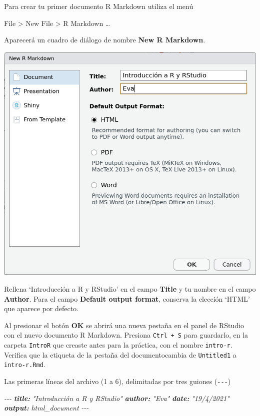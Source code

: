 \documentclass[
  degree=mecinf,
  title=normal,
  toc=normal,
  bib=normal]{mnye}
\newenvironment{Shaded}{\begin{snugshade}}{\end{snugshade}}
\newcommand{\AnnotationTok}[1]{\textcolor[rgb]{0.56,0.35,0.01}{\textbf{\textit{#1}}}}
\newcommand{\CommentTok}[1]{\textcolor[rgb]{0.56,0.35,0.01}{\textit{#1}}}
\begin{document}
Para crear tu primer documento R Markdown utiliza el menú

\begin{menu}
File \textgreater{} New File \textgreater{} R Markdown \ldots{}

\end{menu}

Aparecerá un cuadro de diálogo de nombre \textbf{New R Markdown}.

\begin{center}\includegraphics[width=1\linewidth]{images/new-r-markdown} \end{center}

Rellena `Introducción a R y RStudio' en el campo \textbf{Title} y tu nombre en el campo \textbf{Author}. Para el campo \textbf{Default output format}, conserva la elección `HTML' que aparece por defecto.

Al presionar el botón \textbf{OK} se abrirá una nueva pestaña en el panel de \textsf{RStudio} con el nuevo documento R Markdown. Presiona \texttt{Ctrl\ +\ S} para guardarlo, en la carpeta \texttt{IntroR} que creaste antes para la práctica, con el nombre \texttt{intro-r}. Verifica que la etiqueta de la pestaña del documentocambia de \texttt{Untitled1} a \texttt{intro-r.Rmd}.

Las primeras líneas del archivo (1 a 6), delimitadas por tres guiones (\texttt{-\/-\/-})

\begin{Shaded}
\begin{Highlighting}[]
\CommentTok{{-}{-}{-}}
\AnnotationTok{title:}\CommentTok{ "Introducción a R y RStudio"}
\AnnotationTok{author:}\CommentTok{ "Eva"}
\AnnotationTok{date:}\CommentTok{ "19/4/2021"}
\AnnotationTok{output:}\CommentTok{ html\_document}
\CommentTok{{-}{-}{-}}
\end{Highlighting}
\end{Shaded}
\end{document}
